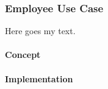 \subsubsection{Employee Use Case}

Here goes my text.

\paragraph{Concept}
\paragraph{Implementation}